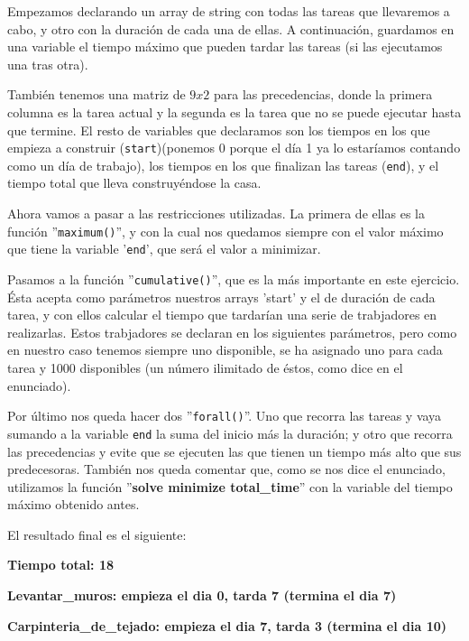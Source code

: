 \documentclass[11pt,a4paper]{article}
\begin{document}
Empezamos declarando un array de string con todas las tareas que llevaremos a cabo, y otro con la duración de cada una de ellas. A continuación,
guardamos en una variable el tiempo máximo que pueden tardar las tareas (si las ejecutamos una tras otra).

También tenemos una matriz de $9x2$ para las precedencias, donde la primera columna es la tarea actual y la segunda es la tarea que no se puede
ejecutar hasta que termine. El resto de variables que declaramos son los tiempos en los que empieza a construir (\texttt{start})(ponemos 0
porque el día 1 ya lo estaríamos contando como un día de trabajo), los tiempos en los que finalizan las tareas (\texttt{end}), y el tiempo total
que lleva construyéndose la casa.

Ahora vamos a pasar a las restricciones utilizadas. La primera de ellas es la función ''\texttt{maximum()}'', y con la cual nos quedamos siempre
con el valor máximo que tiene la variable '\texttt{end}', que será el valor a minimizar.

Pasamos a la función ''\texttt{cumulative()}'', que es la más importante en este ejercicio. Ésta acepta como parámetros nuestros arrays 'start'
y el de duración de cada tarea, y con ellos calcular el tiempo que tardarían una serie de trabjadores en realizarlas. Estos trabjadores se
declaran en los siguientes parámetros, pero como en nuestro caso tenemos siempre uno disponible, se ha asignado uno para cada tarea y 1000
disponibles (un número ilimitado de éstos, como dice en el enunciado).

Por último nos queda hacer dos ''\texttt{forall()}''. Uno que recorra las tareas y vaya sumando a la variable \texttt{end} la suma del inicio
más la duración; y otro que recorra las precedencias y evite que se ejecuten las que tienen un tiempo más alto que sus predecesoras. También
nos queda comentar que, como se nos dice el enunciado, utilizamos la función ''\textbf{solve minimize total\_time}'' con la variable del tiempo
máximo obtenido antes.

El resultado final es el siguiente:

\textbf{Tiempo total: 18} \vspace{-8px}

\textbf{Levantar\_muros: empieza el dia 0, tarda 7 (termina el dia 7)} \vspace{-8px}

\textbf{Carpinteria\_de\_tejado: empieza el dia 7, tarda 3 (termina el dia 10)}\vspace{-8px}
\end{document}
